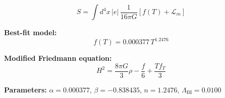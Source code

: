
\begin{equation}
  S = \int d^4x \, |e| \, \frac{1}{16\pi G} \left[ f(T) + \mathcal{L}_m \right]
\end{equation}

\textbf{Best-fit model:}
\begin{equation}
  f(T) = 0.000377 \, T^{1.2476}
\end{equation}

\textbf{Modified Friedmann equation:}
\begin{equation}
  H^2 = \frac{8\pi G}{3} \rho - \frac{f}{6} + \frac{T f_T}{3}
\end{equation}

\textbf{Parameters:}
$\alpha = 0.000377$, \quad
$\beta = -0.838435$, \quad
$n = 1.2476$, \quad
$\Lambda_{\text{BI}} = 0.0100$